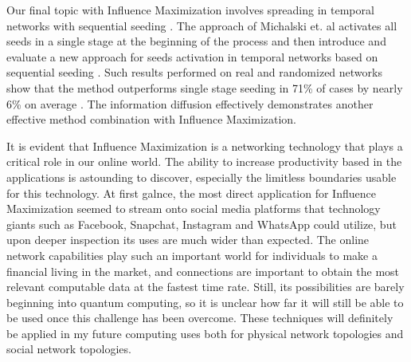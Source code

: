 \documentclass[12pt]{article}
\begin{document}
Our final topic with Influence Maximization involves spreading in temporal networks with sequential seeding \cite{9169627}. 
The approach of Michalski et. al activates all seeds in a single stage at the beginning of the process and then introduce and evaluate a new approach for seeds activation in temporal networks based on sequential seeding \cite{9169627}. 
Such results performed on real and randomized networks show that the method outperforms single stage seeding in 71\% of cases by nearly 6\% on average \cite{9169627}. 
The information diffusion effectively demonstrates another effective method combination with Influence Maximization.

It is evident that Influence Maximization is a networking technology that plays a critical role in our online world. 
The ability to increase productivity based in the applications is astounding to discover, especially the limitless boundaries usable for this technology. 
At first galnce, the most direct application for Influence Maximization seemed to stream onto social media platforms that technology giants such as Facebook, Snapchat, Instagram and WhatsApp could utilize, but upon deeper inspection its uses are much wider than expected. 
The online network capabilities play such an important world for individuals to make a financial living in the market, and connections are important to obtain the most relevant computable data at the fastest time rate. 
Still, its possibilities are barely beginning into quantum computing, so it is unclear how far it will still be able to be used once this challenge has been overcome. 
These techniques will definitely be applied in my future computing uses both for physical network topologies and social network topologies.

\pagebreak

\begin{thebibliography}{99}
\nocite{*}
\end{thebibliography}
\end{document}
